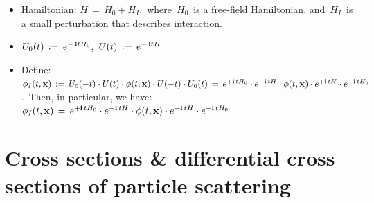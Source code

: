 
\vskip 0.5cm
\noindent
\begin{itemize}
\item
    Hamiltonian:\; $H \,=\, H_{0} + H_{I}$,\, where
    \,$H_{0}$\, is a free-field Hamiltonian, and
    \,$H_{I}$\, is a small perturbation that describes interaction.
\item
    $U_{0}(t) \, := \, e^{-\,\mathbf{i} tH_{0}}$,\,
    \quad
    $U(t) \, := \, e^{-\,\mathbf{i} tH}$
\item
    Define:
    \,$
    \phi_{I}(t,\mathbf{x})
    \, := \,
        U_{0}(-t) \cdot U(t) \cdot \phi(t,\mathbf{x}) \cdot U(-t) \cdot U_{0}(t)
    \, = \,
        e^{+\mathbf{i}\,tH_{0}} \cdot e^{-\mathbf{i}\,tH} \cdot \phi(t,\mathbf{x}) \cdot e^{+\mathbf{i}\,tH} \cdot e^{-\mathbf{i}\,tH_{0}}
    $.\,
    \vskip 0.05cm
    Then, in particular, we have:
    \,$
    \phi_{I}(t,\mathbf{x})
    \, = \,
        e^{+\mathbf{i}\,tH_{0}} \cdot e^{-\mathbf{i}\,tH} \cdot \phi(t,\mathbf{x}) \cdot e^{+\mathbf{i}\,tH} \cdot e^{-\mathbf{i}\,tH_{0}}
    $\,
\end{itemize}


\vskip 0.5cm
\section{Cross sections \& differential cross sections of particle scattering}


